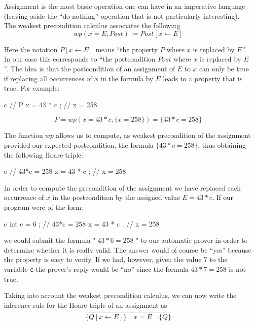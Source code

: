 


Assignment is the most basic operation one can have in an imperative
language (leaving aside the ``do nothing'' operation that is not particularly
interesting). The weakest precondition calculus associates the following
$$wp(x = E , Post) := Post[x \leftarrow E]$$


Here the notation $P[x \leftarrow E]$ means ``the property $P$ where
$x$ is replaced by $E$''. In our case this corresponds to ``the
postcondition $Post$ where $x$ is replaced by $E$''. The idea is
that the postcondition of an assignment of $E$ to $x$ can only be
true if replacing all occurrences of $x$ in the formula by $E$ leads
to a property that is true. For example:



\begin{CodeBlock}{c}
// { P }
x = 43 * c ;
// { x = 258 }
\end{CodeBlock}


$$P = wp(x = 43*c , \{x = 258\}) = \{43*c = 258\}$$


The function $wp$ allows us to compute, as weakest precondition of 
the assignment provided our expected postcondition, the formula
$\{43*c = 258\}$, thus obtaining the following Hoare triple:


\begin{CodeBlock}{c}
// { 43*c = 258 }
x = 43 * c ;
// { x = 258 }
\end{CodeBlock}


In order to compute the precondition of the assignment we have replaced
each occurrence of $x$ in the postcondition by the assigned value
$E = 43*c$. If our program were of the form:



\begin{CodeBlock}{c}
int c = 6 ;
// { 43*c = 258 }
x = 43 * c ;
// { x = 258 }
\end{CodeBlock}



we could submit the formula " $43*6 = 258$ " to our automatic prover
in order to determine whether it is really valid. The answer would of
course be ``yes'' because the property is easy to verify. If we had,
however, given the value 7 to the variable \texttt{c} the prover's reply
would be ``no'' since the formula $43*7 = 258$ is not true.



Taking into account the weakest precondition calculus, we can now write
the inference rule for the Hoare triple of an assignment as
$$\dfrac{}{\{Q[x \leftarrow E] \}\quad x = E \quad\{ Q \}}$$


